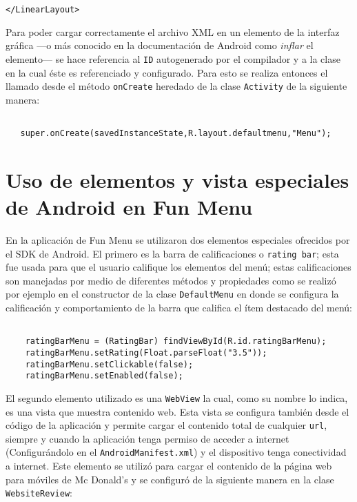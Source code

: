 \documentclass[letterpaper,12pt]{book}
\begin{document}
\begin{mainmatter}
\begin{scriptsize}
\begin{lstlisting}
</LinearLayout>  
\end{lstlisting}
\end{scriptsize}

\normalfont

Para poder cargar correctamente el archivo XML en un elemento de la
interfaz gráfica ---o más conocido en la documentación de Android como
\textit{inflar} el elemento--- se hace referencia al \texttt{ID} autogenerado por el
compilador y a la clase en la cual éste es referenciado y
configurado. Para esto se realiza entonces el llamado desde el método
\texttt{onCreate} heredado de la clase \texttt{Activity} de la siguiente manera:


\begin{scriptsize}
\begin{lstlisting}

   super.onCreate(savedInstanceState,R.layout.defaultmenu,"Menu");

\end{lstlisting}
\end{scriptsize}

\section{Uso de elementos y vista especiales de Android  en Fun Menu}

En la  aplicación de Fun  Menu se utilizaron dos  elementos especiales
ofrecidos  por  el  SDK  de   Android.  El  primero  es  la  barra  de
calificaciones  o \texttt{rating  bar};  esta  fue usada  para  que el  usuario
califique los  elementos del menú; estas  calificaciones son manejadas
por  medio de  diferentes métodos  y propiedades  como se  realizó por
ejemplo  en  el  constructor  de  la clase  \texttt{DefaultMenu}  en  donde  se
configura la calificación y comportamiento de la barra que califica el
ítem destacado del menú:


\begin{scriptsize}
\begin{lstlisting}

	ratingBarMenu = (RatingBar) findViewById(R.id.ratingBarMenu);
	ratingBarMenu.setRating(Float.parseFloat("3.5"));
	ratingBarMenu.setClickable(false);
	ratingBarMenu.setEnabled(false);
\end{lstlisting}
\end{scriptsize}


El segundo elemento utilizado es una \texttt{WebView} la cual, como su nombre lo
indica, es una vista que muestra contenido web. Esta vista se configura también desde el
código de la aplicación y  permite cargar el contenido total de
cualquier \texttt{url}, siempre y cuando la aplicación tenga permiso de acceder
a internet (Configurándolo en el \texttt{AndroidManifest.xml}) y el dispositivo
tenga conectividad a internet.  Este elemento se utilizó para cargar el
contenido de la página web para móviles de Mc Donald’s y se configuró
de la siguiente manera en la clase \texttt{WebsiteReview}:



\end{mainmatter}
\end{document}
